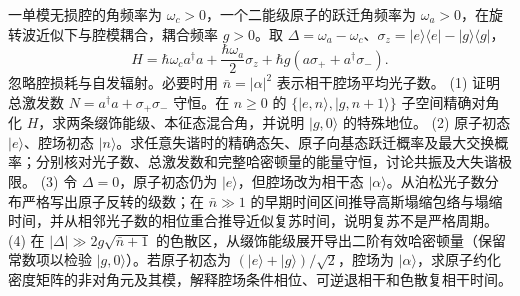 一单模无损腔的角频率为 \(\omega_c>0\)，一个二能级原子的跃迁角频率为 \(\omega_a>0\)，在旋转波近似下与腔模耦合，耦合频率 \(g>0\)。取 \(\Delta=\omega_a-\omega_c\)、\(\sigma_z=|e\rangle\langle e|-|g\rangle\langle g|\)，
\[
H=\hbar\omega_c a^\dagger a+\frac{\hbar\omega_a}{2}\sigma_z+
\hbar g(a\sigma_++a^\dagger\sigma_-).
\]
忽略腔损耗与自发辐射。必要时用 \(\bar n=|\alpha|^2\) 表示相干腔场平均光子数。
(1) 证明总激发数 \(N=a^\dagger a+\sigma_+\sigma_-\) 守恒。在 \(n\geq0\) 的 \(\{|e,n\rangle,|g,n+1\rangle\}\) 子空间精确对角化 \(H\)，求两条缀饰能级、本征态混合角，并说明 \(|g,0\rangle\) 的特殊地位。
(2) 原子初态 \(|e\rangle\)、腔场初态 \(|n\rangle\)。求任意失谐时的精确态矢、原子向基态跃迁概率及最大交换概率；分别核对光子数、总激发数和完整哈密顿量的能量守恒，讨论共振及大失谐极限。
(3) 令 \(\Delta=0\)，原子初态仍为 \(|e\rangle\)，但腔场改为相干态 \(|\alpha\rangle\)。从泊松光子数分布严格写出原子反转的级数；在 \(\bar n\gg1\) 的早期时间区间推导高斯塌缩包络与塌缩时间，并从相邻光子数的相位重合推导近似复苏时间，说明复苏不是严格周期。
(4) 在 \(|\Delta|\gg2g\sqrt{\bar n+1}\) 的色散区，从缀饰能级展开导出二阶有效哈密顿量（保留常数项以检验 \(|g,0\rangle\)）。若原子初态为 \((|e\rangle+|g\rangle)/\sqrt2\)，腔场为 \(|\alpha\rangle\)，求原子约化密度矩阵的非对角元及其模，解释腔场条件相位、可逆退相干和色散复相干时间。
